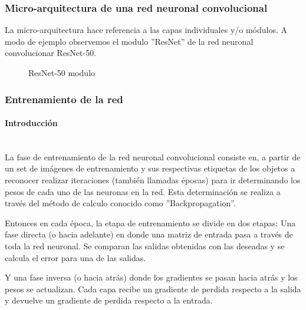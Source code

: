 \subsubsection{Micro-arquitectura de una red neuronal convolucional}

La micro-arquitectura hace referencia a las capas individuales y/o módulos. A modo de ejemplo observemos el modulo ''ResNet'' de la red neuronal convolucionar ResNet-50.\par

\begin{figure}[H]
\hfill
{}
\hfill
{}
\hfill
\caption{ResNet-50 modulo}
\end{figure}


\subsubsection{Entrenamiento de la red}

\paragraph{Introducción}\mbox{}\\

La fase de entrenamiento de la red neuronal convolucional consiste en, a partir de un set de imágenes de entrenamiento y sus respectivas etiquetas de los objetos a reconocer realizar iteraciones (también llamadas épocas) para ir determinando los pesos de cada uno de las neuronas en la red. Esta determinación se realiza a través del método de calculo conocido como ''Backpropagation''.\par
\bigbreak
Entonces en cada época, la etapa de entrenamiento se divide en dos etapas: Una fase directa (o hacia adelante) en donde una matriz de entrada pasa a través de toda la red neuronal. Se comparan las salidas obtenidas con las deseadas y se calcula el error para una de las salidas.\par
Y una fase inversa (o hacia atrás) donde los gradientes se pasan hacia atrás y los pesos se actualizan. Cada capa recibe un gradiente de perdida respecto a la salida y devuelve un gradiente de perdida respecto a la entrada. \par


